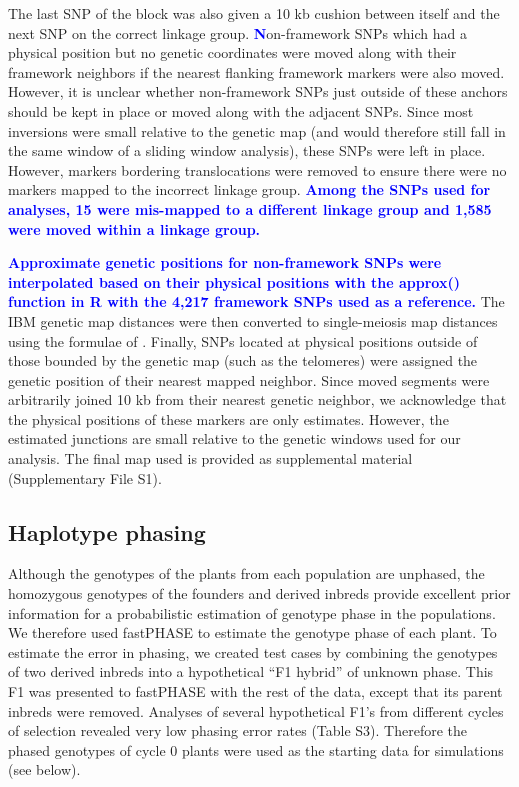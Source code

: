 \documentclass[twocolumn,twoside,letterpaper]{article}
\newcommand{\jpg}[1]{\todo[size=\scriptsize, color=gerkegreen]{#1}}
\newcommand{\rev}[1]{\textcolor{blue}{\bf #1}}
\begin{document}
The last SNP of the block was also given a 10 kb cushion between itself and the next SNP on the correct linkage group. 
\rev Non-framework SNPs which had a physical position but no genetic coordinates were moved along with their framework neighbors if the nearest flanking framework markers were also moved.
However, it is unclear whether non-framework SNPs just outside of these anchors should be kept in place or moved along with the adjacent SNPs. 
Since most inversions were small relative to the genetic map (and would therefore still fall in the same window of a sliding window analysis), these SNPs were left in place. 
However, markers bordering translocations were removed to ensure there were no markers mapped to the incorrect linkage group. 
\rev{Among the SNPs used for analyses, 15 were mis-mapped to a different linkage group and 1,585 were moved within a linkage group.}

\rev{Approximate genetic positions for non-framework SNPs were interpolated based on their physical positions with the approx() function in R \citep{rteam} with the 4,217 framework SNPs used as a reference.}
The IBM genetic map distances were then converted to single-meiosis map distances using the formulae of \citet{winkler2003determination}. 
Finally, SNPs located at physical positions outside of those bounded by the genetic map (such as the telomeres) were assigned the genetic position of their nearest mapped neighbor. 
Since moved segments were arbitrarily joined 10 kb from their nearest genetic neighbor, we acknowledge that the physical positions of these markers are only estimates. 
However, the estimated junctions are small relative to the genetic windows used for our analysis. 
The final map used is provided as supplemental material (Supplementary File S1).
	
\subsection*{Haplotype phasing}
Although the genotypes of the plants from each population are unphased, the homozygous genotypes of the founders and derived inbreds provide excellent prior information for a probabilistic estimation of genotype phase in the populations. 
We therefore used fastPHASE \citep{scheet2006fast} to estimate the genotype phase of each plant. To estimate the error in phasing, we created test cases by combining the genotypes of two derived inbreds into a hypothetical “F1 hybrid” of unknown phase. 
This F1 was presented to fastPHASE with the rest of the data, except that its parent inbreds were removed. 
Analyses of several hypothetical F1’s from different cycles of selection revealed very low phasing error rates (Table S3).  \jpg{S2 now?}
Therefore the phased genotypes of cycle 0 plants were used as the starting data for simulations (see below).
\end{document}
